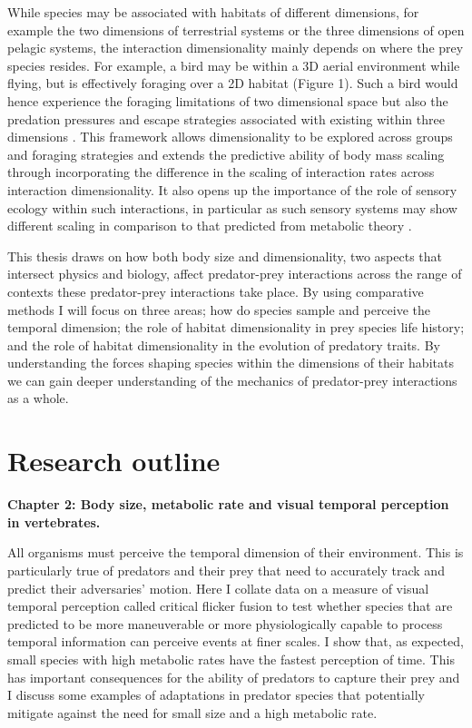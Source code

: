 While species may be associated with habitats of different dimensions, for example the two dimensions of terrestrial systems or the three dimensions of open pelagic systems, the interaction dimensionality mainly depends on where the prey species resides. For example, a bird may be within a 3D aerial environment while flying, but is effectively foraging over a 2D habitat (Figure 1). Such a bird would hence experience the foraging limitations of two dimensional space but also the predation pressures and escape strategies associated with existing within three dimensions \citep{pawar2012dimensionality}. This framework allows dimensionality to be explored across groups and foraging strategies and extends the predictive ability of body mass scaling through incorporating the difference in the scaling of interaction rates across interaction dimensionality. 
It also opens up the importance of the role of sensory ecology within such interactions, in particular as such sensory systems may show different scaling in comparison to that predicted from metabolic theory \citep{mcgill2006allometric,kiltie2000scaling}. 


This thesis draws on how both body size and dimensionality, two aspects that intersect physics and biology, affect predator-prey interactions across the range of contexts these predator-prey interactions take place. By using comparative methods I will focus on three areas; how do species sample and perceive the temporal dimension; the role of habitat dimensionality in prey species life history; and the role of habitat dimensionality in the evolution of predatory traits. By understanding the forces shaping species within the dimensions of their habitats we can gain deeper understanding of the mechanics of predator-prey interactions as a whole.\\


\section{\uppercase{R}esearch outline}


\textbf{Chapter 2: Body size, metabolic rate and visual temporal perception in vertebrates.}


 All organisms must perceive the temporal dimension of their environment. This is particularly true of predators and their prey that need to accurately track and predict their adversaries' motion. Here I collate data on a measure of visual temporal perception called critical flicker fusion to test whether species that are predicted to be more maneuverable or more physiologically capable to process temporal information can perceive events at finer scales. I show that, as expected, small species with high metabolic rates have the fastest perception of time. This has important consequences for the ability of predators to capture their prey and I discuss some examples of adaptations in predator species that potentially mitigate against the need for small size and a high metabolic rate.\\


